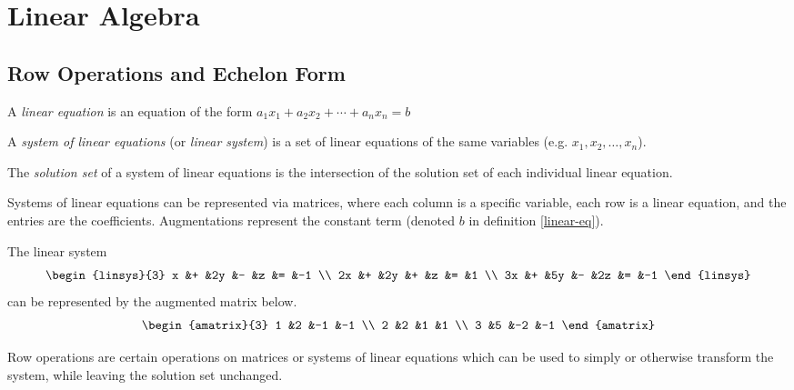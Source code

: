 \chapter{Linear Algebra}
\label{ch:linear}

\section{Row Operations and Echelon Form}

\begin{defn}\label{linear-eq}
    A \emph{linear equation} is an equation of the form $a_1x_1 + a_2x_2 + \cdots + a_nx_n = b$
\end{defn}

\begin{defn}\label{linear-sys}
    A \emph{system of linear equations} (or \emph{linear system}) is a set of linear equations of the same variables (e.g. $x_1, x_2, \ldots, x_n$).
\end{defn}

\begin{defn}\label{linear-sys-solutions}
    The \emph{solution set} of a system of linear equations is the intersection of the solution set of each individual linear equation.
\end{defn}

Systems of linear equations can be represented via matrices, where each column is a specific variable, each row is a linear equation, and the entries are the coefficients. Augmentations represent the constant term (denoted $b$ in definition \ref{linear-eq}).

\begin{exmp}
    The linear system \[\begin{linsys}{3}
            x &+ &2y &- &z &= &-1 \\
            2x &+ &2y &+ &z &= &1 \\
            3x &+ &5y &- &2z &= &-1
        \end{linsys}\] can be represented by the augmented matrix below.
    \[\begin{amatrix}{3}
            1 &2 &-1 &-1 \\
            2 &2 &1 &1 \\
            3 &5 &-2 &-1
        \end{amatrix}\]
\end{exmp}

Row operations are certain operations on matrices or systems of linear equations which can be used to simply or otherwise transform the system, while leaving the solution set unchanged.

